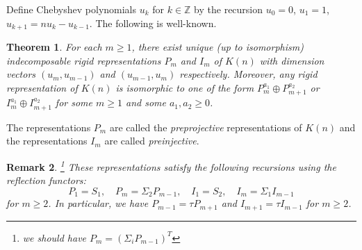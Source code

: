 \documentclass{amsart}
\newtheorem{theorem}{Theorem}[section]
\newtheorem{corollary}[theorem]{Corollary}
\newtheorem{remark}[theorem]{Remark}
\newcommand{\CC}{\mathbb{C}}
\newcommand{\ZZ}{\mathbb{Z}}
\begin{document}
Define Chebyshev polynomials $u_k$ for $k\in\ZZ$ by the recursion $u_0=0$, $u_1=1$, $u_{k+1}=nu_k-u_{k-1}$.
The following is well-known.
\begin{theorem}
  \label{th:rigids}
  For each $m\ge1$, there exist unique (up to isomorphism) indecomposable rigid representations $P_m$ and $I_m$ of $K(n)$ with dimension vectors $(u_m,u_{m-1})$ and $(u_{m-1},u_m)$ respectively. 
  Moreover, any rigid representation of $K(n)$ is isomorphic to one of the form $P_m^{a_1}\oplus P_{m+1}^{a_2}$ or $I_m^{a_1}\oplus I_{m+1}^{a_2}$ for some $m\ge1$ and some $a_1,a_2\ge0$.
\end{theorem}
The representations $P_m$ are called the \emph{preprojective} representations of $K(n)$ and the representations $I_m$ are called \emph{preinjective}.
\begin{remark}\footnote{we should have $P_m=(\Sigma_iP_{m-1})^T$}
  \label{rem:reflection recursion}
  These representations satisfy the following recursions using the reflection functors:
  \[P_1=S_1,\quad P_m=\Sigma_2 P_{m-1},\quad I_1=S_2,\quad I_m=\Sigma_1 I_{m-1}\]
  for $m\ge2$.
  In particular, we have $P_{m-1}=\tau P_{m+1}$ and $I_{m+1}=\tau I_{m-1}$ for $m\ge2$. 
\end{remark}
\end{document}
